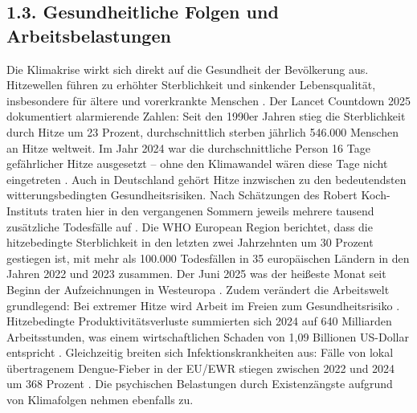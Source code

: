 \documentclass[12pt, a4paper]{article}
\begin{document}
	\subsection*{1.3. Gesundheitliche Folgen und Arbeitsbelastungen}
	Die Klimakrise wirkt sich direkt auf die Gesundheit der Bevölkerung aus.
	Hitzewellen
	führen zu erhöhter Sterblichkeit und sinkender Lebensqualität, insbesondere für
	ältere und vorerkrankte Menschen \cite{rehm2025}.
	Der Lancet Countdown 2025
	dokumentiert alarmierende Zahlen: Seit den 1990er Jahren stieg die Sterblichkeit durch
	Hitze um 23 Prozent, durchschnittlich sterben jährlich 546.000 Menschen an Hitze
	weltweit.
	Im Jahr 2024 war die durchschnittliche Person 16 Tage gefährlicher Hitze
	ausgesetzt – ohne den Klimawandel wären diese Tage nicht eingetreten \cite{lancet2025}.
	Auch in Deutschland gehört Hitze inzwischen zu den bedeutendsten witterungsbedingten
	Gesundheitsrisiken.
	Nach Schätzungen des Robert Koch-Instituts traten hier in den
	vergangenen Sommern jeweils mehrere tausend zusätzliche Todesfälle auf \cite{rki2025}.
	Die WHO European Region berichtet, dass die hitzebedingte Sterblichkeit in den letzten
	zwei Jahrzehnten um 30 Prozent gestiegen ist, mit mehr als 100.000 Todesfällen in
	35 europäischen Ländern in den Jahren 2022 und 2023 zusammen.
	Der Juni 2025 was der
	heißeste Monat seit Beginn der Aufzeichnungen in Westeuropa \cite{who2025}.
	Zudem
	verändert die Arbeitswelt grundlegend: Bei extremer Hitze wird Arbeit
	im Freien zum Gesundheitsrisiko \cite{medienservice2026}.
	Hitzebedingte
	Produktivitätsverluste summierten sich 2024 auf 640 Milliarden Arbeitsstunden, was
	einem wirtschaftlichen Schaden von 1,09 Billionen US-Dollar entspricht \cite{lancet2025}.
	Gleichzeitig breiten sich Infektionskrankheiten aus: Fälle von lokal übertragenem
	Dengue-Fieber in der EU/EWR stiegen zwischen 2022 und 2024 um 368 Prozent \cite{ecdc2025}.
	Die psychischen Belastungen durch Existenzängste aufgrund von Klimafolgen nehmen
	ebenfalls zu.
	
\end{document}
